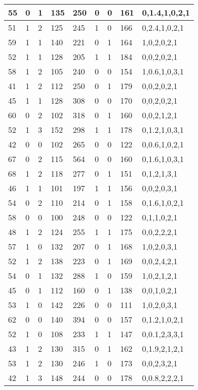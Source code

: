 \documentclass{article}
\begin{document}
\begin{table}[h!]
\begin{tabular}{|l|l|l|l|l|l|l|l|l|}
55 & 0 & 1 & 135 & 250 & 0 & 0 & 161 & 0,1.4,1,0,2,1 \\ \hline
51 & 1 & 2 & 125 & 245 & 1 & 0 & 166 & 0,2.4,1,0,2,1 \\ \hline
59 & 1 & 1 & 140 & 221 & 0 & 1 & 164 & 1,0,2,0,2,1 \\ \hline
52 & 1 & 1 & 128 & 205 & 1 & 1 & 184 & 0,0,2,0,2,1 \\ \hline
58 & 1 & 2 & 105 & 240 & 0 & 0 & 154 & 1,0.6,1,0,3,1 \\ \hline
41 & 1 & 2 & 112 & 250 & 0 & 1 & 179 & 0,0,2,0,2,1 \\ \hline
45 & 1 & 1 & 128 & 308 & 0 & 0 & 170 & 0,0,2,0,2,1 \\ \hline
60 & 0 & 2 & 102 & 318 & 0 & 1 & 160 & 0,0,2,1,2,1 \\ \hline
52 & 1 & 3 & 152 & 298 & 1 & 1 & 178 & 0,1.2,1,0,3,1 \\ \hline
42 & 0 & 0 & 102 & 265 & 0 & 0 & 122 & 0,0.6,1,0,2,1 \\ \hline
67 & 0 & 2 & 115 & 564 & 0 & 0 & 160 & 0,1.6,1,0,3,1 \\ \hline
68 & 1 & 2 & 118 & 277 & 0 & 1 & 151 & 0,1,2,1,3,1 \\ \hline
46 & 1 & 1 & 101 & 197 & 1 & 1 & 156 & 0,0,2,0,3,1 \\ \hline
54 & 0 & 2 & 110 & 214 & 0 & 1 & 158 & 0,1.6,1,0,2,1 \\ \hline
58 & 0 & 0 & 100 & 248 & 0 & 0 & 122 & 0,1,1,0,2,1 \\ \hline
48 & 1 & 2 & 124 & 255 & 1 & 1 & 175 & 0,0,2,2,2,1 \\ \hline
57 & 1 & 0 & 132 & 207 & 0 & 1 & 168 & 1,0,2,0,3,1 \\ \hline
52 & 1 & 2 & 138 & 223 & 0 & 1 & 169 & 0,0,2,4,2,1 \\ \hline
54 & 0 & 1 & 132 & 288 & 1 & 0 & 159 & 1,0,2,1,2,1 \\ \hline
45 & 0 & 1 & 112 & 160 & 0 & 1 & 138 & 0,0,1,0,2,1 \\ \hline
53 & 1 & 0 & 142 & 226 & 0 & 0 & 111 & 1,0,2,0,3,1 \\ \hline
62 & 0 & 0 & 140 & 394 & 0 & 0 & 157 & 0,1.2,1,0,2,1 \\ \hline
52 & 1 & 0 & 108 & 233 & 1 & 1 & 147 & 0,0.1,2,3,3,1 \\ \hline
43 & 1 & 2 & 130 & 315 & 0 & 1 & 162 & 0,1.9,2,1,2,1 \\ \hline
53 & 1 & 2 & 130 & 246 & 1 & 0 & 173 & 0,0,2,3,2,1 \\ \hline
42 & 1 & 3 & 148 & 244 & 0 & 0 & 178 & 0,0.8,2,2,2,1 \\ \hline

\end{tabular}
\end{table}
\end{document}
